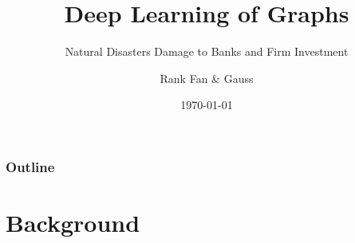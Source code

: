 \documentclass[UTF8, aspectratio=169 , 10pt，punct=kaiming]{beamer} %
\title{Deep Learning of Graphs }
\subtitle{Natural Disasters  Damage to Banks and Firm Investment}
\author[Rank Fan \& Gauss ] {\small{Rank Fan \& Gauss }} %
\institute{XMU WISE} %
\date{\today}
\begin{document}
\small




\frame[plain]{\titlepage}





\begin{frame}[plain]
   \begin{multicols}{1}
     \frametitle{Outline}
     \tableofcontents
  \end{multicols}
\end{frame}



\section{Background}
\end{document}
